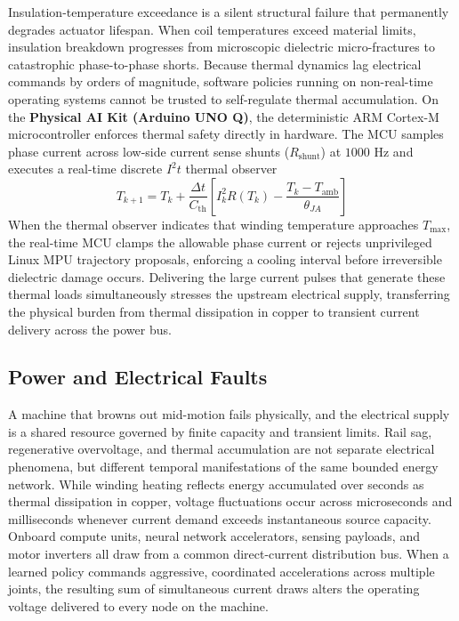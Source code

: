 \documentclass[
  letterpaper,
  DIV=11,
  numbers=noendperiod]{scrartcl}
\begin{document}
Insulation-temperature exceedance is a silent structural failure that
permanently degrades actuator lifespan. When coil temperatures exceed
material limits, insulation breakdown progresses from microscopic
dielectric micro-fractures to catastrophic phase-to-phase shorts.
Because thermal dynamics lag electrical commands by orders of magnitude,
software policies running on non-real-time operating systems cannot be
trusted to self-regulate thermal accumulation. On the \textbf{Physical
AI Kit (Arduino UNO Q)}, the deterministic ARM Cortex-M microcontroller
enforces thermal safety directly in hardware. The MCU samples phase
current across low-side current sense shunts (\(R_{\text{shunt}}\)) at
\(1000\text{ Hz}\) and executes a real-time discrete \(I^2 t\) thermal
observer
\[T_{k+1} = T_k + \frac{\Delta t}{C_{\text{th}}} \left[ I_k^2 R(T_k) - \frac{T_k - T_{\text{amb}}}{\theta_{JA}} \right]\]
When the thermal observer indicates that winding temperature approaches
\(T_{\text{max}}\), the real-time MCU clamps the allowable phase current
or rejects unprivileged Linux MPU trajectory proposals, enforcing a
cooling interval before irreversible dielectric damage occurs.
Delivering the large current pulses that generate these thermal loads
simultaneously stresses the upstream electrical supply, transferring the
physical burden from thermal dissipation in copper to transient current
delivery across the power bus.

\subsection{Power and Electrical Faults}\label{sec-body-2-6}

A machine that browns out mid-motion fails physically, and the
electrical supply is a shared resource governed by finite capacity and
transient limits. Rail sag, regenerative overvoltage, and thermal
accumulation are not separate electrical phenomena, but different
temporal manifestations of the same bounded energy network. While
winding heating reflects energy accumulated over seconds as thermal
dissipation in copper, voltage fluctuations occur across microseconds
and milliseconds whenever current demand exceeds instantaneous source
capacity. Onboard compute units, neural network accelerators, sensing
payloads, and motor inverters all draw from a common direct-current
distribution bus. When a learned policy commands aggressive, coordinated
accelerations across multiple joints, the resulting sum of simultaneous
current draws alters the operating voltage delivered to every node on
the machine.
\end{document}
